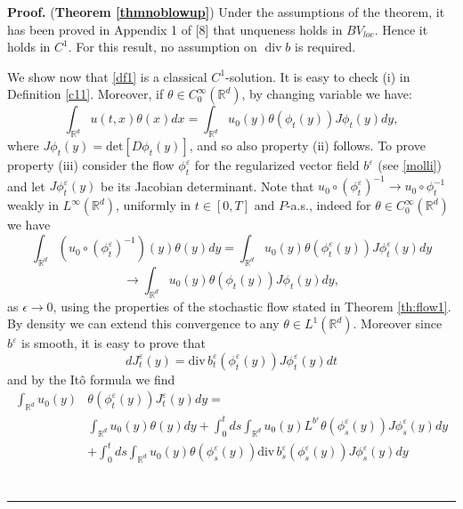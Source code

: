 \documentclass{article}
\newenvironment{proof}[1][Proof]{\noindent\textbf{#1.} }{\ \rule{0.5em}{0.5em}}
\begin{document}
\begin{proof}
(\textbf{Theorem \ref{thmnoblowup}})
Under the assumptions of the theorem, it has been proved in Appendix 1 of [8]
that unqueness holds in $BV_{loc}$. Hence it holds in $C^{1}$. For this
result, no assumption on $\operatorname{div}b$ is required.




 We show now that \eqref{df1} is a classical
$C^{1}$-solution.
It is easy to check (i) in Definition \ref{c11}.  Moreover, if $\theta\in
C_{0}^{\infty}(\mathbb{R} ^{d})$, by changing variable we have:
\[
\int_{{}{\mathbb{R}}^{d}}u(t,x)\theta(x)dx=\int_{{}{\mathbb{R}}^{d}}
u_{0}(y)\theta(\phi_{t}(y))J \phi_{t}(y)dy,
\]
where $J \phi_{t}(y) = \text{det}[D \phi_{t} (y) ]$,  and so also property
(ii) follows.
%
To prove property (iii) consider the flow $\phi_{t}^{\varepsilon}$ for the
regularized vector field $b^{\varepsilon}$ (see \eqref{molli}) and let $J
\phi_{t}^{\varepsilon}(y)$ be its Jacobian determinant. Note that $u_{0}
\circ(\phi^{\varepsilon}_{t})^{-1} \to u_{0} \circ\phi_{t}^{-1}$ weakly in
$L^{\infty}(\mathbb{R}^{d})$, uniformly in $t \in[0,T]$ and $P$-a.s., indeed
for $\theta\in C_{0}^{\infty}(\mathbb{R} ^{d})$ we have
\[
\int_{{}{\mathbb{R}}^{d}} (u_{0} \circ(\phi^{\varepsilon}_{t})^{-1} )(y)
\theta(y) dy = \int_{{}{\mathbb{R}}^{d}} u_{0}(y) \theta(\phi^{\varepsilon
}_{t}(y)) J \phi_{t}^{\varepsilon}(y) dy
\]%
\[
\to
\int_{{}{\mathbb{R}}^{d}} u_{0}(y) \theta(\phi_{t}(y)) J \phi_{t}(y) dy,
\]
 as $\epsilon \to 0$,
  using the properties of the stochastic flow stated in Theorem
 \ref{th:flow1}.
  By density we can extend this convergence to any $\theta\in
L^{1}(\mathbb{R} ^{d})$. Moreover since $b^{\varepsilon}$ is smooth,
it is easy to prove that
\[
dJ_{t}^{\varepsilon}(y)={\mathrm{div}\,}b^{\varepsilon}_{t}(\phi
_{t}^{\varepsilon}(y))J \phi_{t}^{\varepsilon}(y)dt
\]
and by the It\^o formula we find
\begin{equation}
\label{ii}
\begin{split}
\int_{{\mathbb{R}}^{d}}u_{0}(y) & \theta(\phi_{t}^{\varepsilon}(y))J_{t} %
^{\varepsilon}(y)dy  =
\\ &  \int_{{\mathbb{R}}^{d}}u_{0}(y)\theta(y)dy+\int%
_{0}^{t}ds \int_{{\mathbb{R}}^{d}}u_{0}(y)L^{b^{\varepsilon}}\theta(\phi
_{s}^{\varepsilon}(y))J \phi_{s}^{\varepsilon}(y)dy\\
&  +\int_{0}^{t}ds\int_{{\mathbb{R}}^{d}}u_{0}(y) \theta(\phi_{s}%
^{\varepsilon}(y)){\mathrm{div}\, }b^{\varepsilon}_{s} (\phi_{s}^{\varepsilon
}(y))J \phi_{s}^{\varepsilon}(y)dy\\

\end{split}
\end{equation}
\end{proof}
\end{document}
